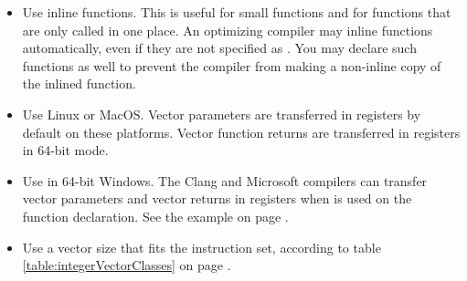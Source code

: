 \documentclass[vcl_manual.tex]{subfiles}
\begin{document}
\begin{itemize}
\item Use inline functions. This is useful for small functions and for functions that are only called in one place. An optimizing compiler may inline functions automatically, even if they are not specified as . You may declare such functions  as well to prevent the compiler from making a non-inline copy of the inlined function.

\item Use Linux or MacOS. Vector parameters are transferred in registers by default on these platforms. Vector function returns are transferred in registers in 64-bit mode.

\item Use  in 64-bit Windows. The Clang and Microsoft compilers can transfer vector parameters and vector returns in registers when  is used on the function declaration. See the example on page \pageref{examplePolynomialVectorcall}.

\item Use a vector size that fits the instruction set, according to table \ref{table:integerVectorClasses} on page \pageref{table:integerVectorClasses}.

\end{itemize}
\end{document}

